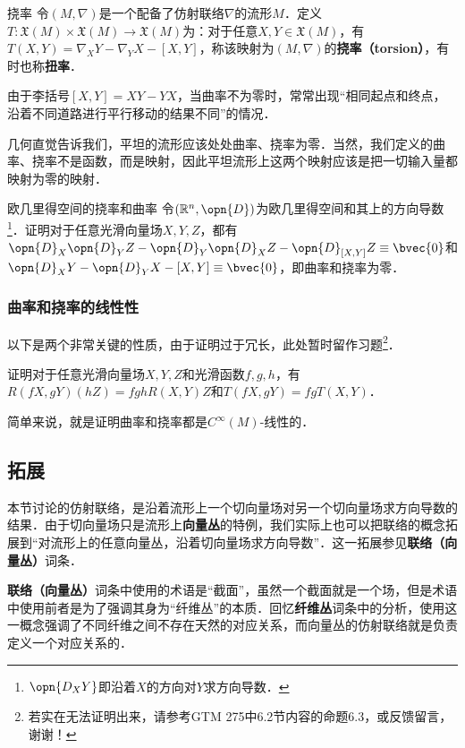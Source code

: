 \begin{definition}{挠率}
令$(M, \nabla)$是一个配备了仿射联络$\nabla$的流形$M$．定义$T:\mathfrak{X}(M)\times\mathfrak{X}(M)\to\mathfrak{X}(M)$为：对于任意$X, Y\in\mathfrak{X}(M)$，有$T(X, Y)=\nabla_XY-\nabla_YX-{[X, Y]}$，称该映射为$(M, \nabla)$的\textbf{挠率（torsion）}，有时也称\textbf{扭率}．
\end{definition}

由于李括号$[X, Y]=XY-YX$，当曲率不为零时，常常出现“相同起点和终点，沿着不同道路进行平行移动的结果不同”的情况．

几何直觉告诉我们，平坦的流形应该处处曲率、挠率为零．当然，我们定义的曲率、挠率不是函数，而是映射，因此平坦流形上这两个映射应该是把一切输入量都映射为零的映射．

\begin{exercise}{欧几里得空间的挠率和曲率}
令$(\mathbb{R}^n, \opn{D})$为欧几里得空间和其上的方向导数\footnote{$\opn{D_XY}$即沿着$X$的方向对$Y$求方向导数．}．证明对于任意光滑向量场$X, Y, Z$，都有$\opn{D}_X\opn{D}_YZ-\opn{D}_Y\opn{D}_XZ-\opn{D}_{[X, Y]}Z\equiv\bvec{0}$和$\opn{D}_XY-\opn{D}_YX-{[X, Y]}\equiv\bvec{0}$，即曲率和挠率为零．
\end{exercise}

\subsubsection{曲率和挠率的线性性}

以下是两个非常关键的性质，由于证明过于冗长，此处暂时留作习题\footnote{若实在无法证明出来，请参考GTM 275\cite{GTM275}中6.2节内容的命题6.3，或反馈留言，谢谢！}．

\begin{exercise}{}\label{affcon_exe1}
证明对于任意光滑向量场$X, Y, Z$和光滑函数$f, g, h$，有$R(fX, gY)(hZ)=fghR(X, Y)Z$和$T(fX, gY)=fgT(X, Y)$．

简单来说，就是证明曲率和挠率都是$C^{\infty}(M)$-线性的．
\end{exercise}





\subsection{拓展}

本节讨论的仿射联络，是沿着流形上一个切向量场对另一个切向量场求方向导数的结果．由于切向量场只是流形上\textbf{向量丛}的特例，我们实际上也可以把联络的概念拓展到“对流形上的任意向量丛，沿着切向量场求方向导数”．这一拓展参见\textbf{联络（向量丛）}词条．

\textbf{联络（向量丛）}词条中使用的术语是“截面”，虽然一个截面就是一个场，但是术语中使用前者是为了强调其身为“纤维丛”的本质．回忆\textbf{纤维丛}词条中的分析，使用这一概念强调了不同纤维之间不存在天然的对应关系，而向量丛的仿射联络就是负责定义一个对应关系的．




